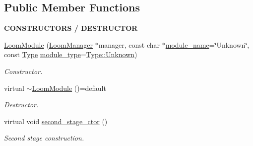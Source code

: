 \subsection*{Public Member Functions}
\begin{Indent}{\bf C\+O\+N\+S\+T\+R\+U\+C\+T\+O\+RS / D\+E\+S\+T\+R\+U\+C\+T\+OR}\par
\begin{DoxyCompactItemize}
\item 
\hyperlink{class_loom_module_a5e0d9e185ade9e2ae5be68fdefb25887}{Loom\+Module} (\hyperlink{class_loom_manager}{Loom\+Manager} $\ast$manager, const char $\ast$\hyperlink{class_loom_module_adf6e68ad7e9fa2acfca7a8a280680764}{module\+\_\+name}=\char`\"{}Unknown\char`\"{}, const \hyperlink{class_loom_module_aee91d0a75140d51ee428fc2d4417d865}{Type} \hyperlink{class_loom_module_a152d394f37236a2b159dae19da67eeb0}{module\+\_\+type}=\hyperlink{class_loom_module_aee91d0a75140d51ee428fc2d4417d865a88183b946cc5f0e8c96b2e66e1c74a7e}{Type\+::\+Unknown})
\begin{DoxyCompactList}\small\item\em Constructor. \end{DoxyCompactList}\item 
virtual \hyperlink{class_loom_module_aec256a84e0498d723540743849e0166c}{$\sim$\+Loom\+Module} ()=default
\begin{DoxyCompactList}\small\item\em Destructor. \end{DoxyCompactList}\item 
virtual void \hyperlink{class_loom_module_a8dd3704d1bd38868d5774e48c1073d12}{second\+\_\+stage\+\_\+ctor} ()
\begin{DoxyCompactList}\small\item\em Second stage construction. \end{DoxyCompactList}\end{DoxyCompactItemize}
\end{Indent}
